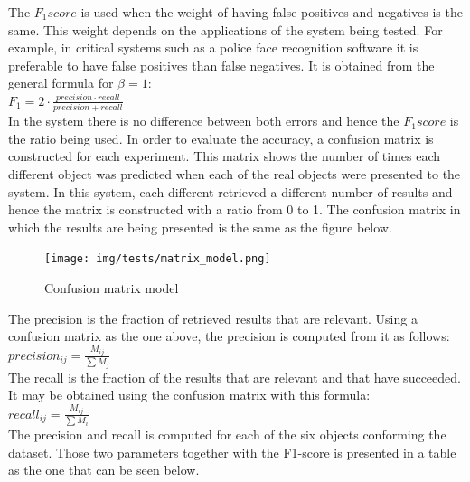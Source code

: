 
		The $F_1 score$ is used when the weight of having false positives and negatives is the same. 
		This weight depends on the applications of the system being tested. 
		For example, in critical systems such as a police face recognition software it is preferable to have false positives than false negatives. 
		It is obtained from the general formula for $\beta=1$: 	
		\\

		$F_1=2\cdot\frac{precision \cdot recall}{precision + recall}$
		\\

		In the system there is no difference between both errors and hence the $F_1 score$ is the ratio being used. 
		In order to evaluate the accuracy, a confusion matrix is constructed for each experiment. 
		This matrix shows the number of times each different object was predicted when each of the real objects were presented to the system. 
		In this system, each different retrieved a different number of results and hence the matrix is constructed with a ratio from 0 to 1. 
		The confusion matrix in which the results are being presented is the same as the figure below. 


		\begin{figure}[H]
				\begin{center}
			    \texttt{[image: img/tests/matrix\_model.png]}
				\caption[Confusion matrix model]{Confusion matrix model}
				\end{center}
		\end{figure}


		The precision is the fraction of retrieved results that are relevant.  
		Using a confusion matrix as the one above, the precision is computed from it as follows: 
		\\

		$precision_{ij}=\frac{M_{ij}}{\sum M_j}$
		\\

		The recall is the fraction of the results that are relevant and that have succeeded. 
		It may be obtained using the confusion matrix with this formula: 
		\\

		$recall_{ij}=\frac{M_{ij}}{\sum M_i}$
		\\

		The precision and recall is computed for each of the six objects conforming the dataset. 
		Those two parameters together with the F1-score is presented in a table as the one that can be seen below. 

